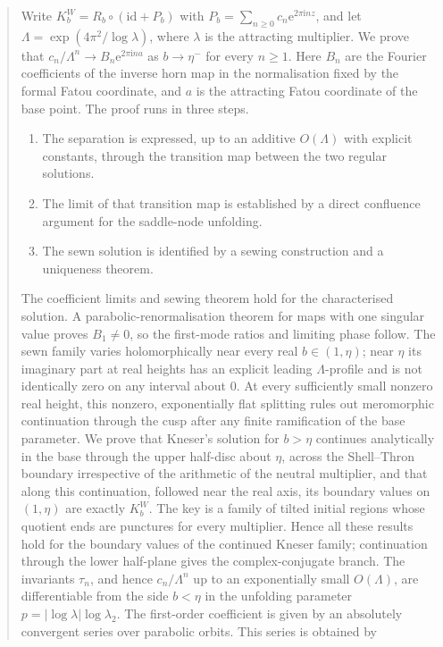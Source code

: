 \documentclass[11pt]{amsart}
\theoremstyle{definition}
\newcommand{\Rr}{R}
\newcommand{\Kk}{K}
\newcommand{\eee}{\mathrm{e}}
\newcommand{\ii}{\mathrm{i}}
\begin{document}
\begin{abstract}
Write $\Kk^W_b=\Rr_b\circ(\mathrm{id}+P_b)$ with $P_b=\sum_{n\ge0}c_n\eee^{2\pi\ii nz}$,
and let $\Lambda=\exp(4\pi^2/\log\lambda)$, where $\lambda$ is the attracting
multiplier.  We prove that
$c_n/\Lambda^n\to B_n\eee^{2\pi\ii na}$ as $b\to\eta^-$ for every $n\ge1$.  Here
$B_n$ are the Fourier coefficients of the inverse horn map in the normalisation
fixed by the formal Fatou coordinate, and $a$ is the attracting Fatou
coordinate of the base point.  The proof runs in three steps.
\begin{enumerate}
\item The separation is expressed, up to an additive $O(\Lambda)$ with explicit
  constants, through the transition map between the two regular solutions.
\item The limit of that transition map is established by a direct confluence
  argument for the saddle-node unfolding.
\item The sewn solution is identified by a sewing construction and a
  uniqueness theorem.
\end{enumerate}
The coefficient limits and sewing theorem hold for the characterised
solution.  A parabolic-renormalisation theorem for maps with one singular
value proves $B_1\ne0$, so the first-mode ratios and limiting phase follow.
The sewn family varies holomorphically near every real $b\in(1,\eta)$;
near $\eta$ its imaginary part at real heights has an explicit leading
$\Lambda$-profile and is not identically zero on any interval about $0$.
At every sufficiently small nonzero real height, this nonzero,
exponentially flat splitting rules out meromorphic continuation through
the cusp after any finite ramification of the base parameter.
We prove that Kneser's solution for $b>\eta$ continues analytically in the
base through the upper half-disc about $\eta$, across the Shell--Thron
boundary irrespective of the arithmetic of the neutral multiplier, and that
along this continuation, followed near the real axis, its boundary values
on $(1,\eta)$ are exactly $\Kk^W_b$.  The key is a
family of tilted initial regions whose quotient ends are punctures for
every multiplier.  Hence all these results hold for the boundary values of
the continued Kneser family; continuation through the lower half-plane
gives the complex-conjugate branch.  The invariants $\tau_n$, and hence $c_n/\Lambda^n$ up to an exponentially
small $O(\Lambda)$, are differentiable from the side $b<\eta$ in the unfolding
parameter $p=|\log\lambda|\log\lambda_2$.  The first-order coefficient is given by an
absolutely convergent series over parabolic orbits.  This series is obtained by

\end{abstract}
\end{document}
